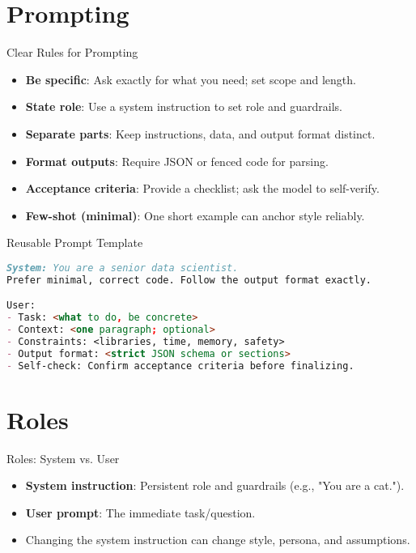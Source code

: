 \documentclass[aspectratio=169]{beamer}
\begin{document}
\section{Prompting}

\begin{frame}{Clear Rules for Prompting}
  \begin{itemize}
    \item \textbf{Be specific}: Ask exactly for what you need; set scope and length.
    \item \textbf{State role}: Use a system instruction to set role and guardrails.
    \item \textbf{Separate parts}: Keep instructions, data, and output format distinct.
    \item \textbf{Format outputs}: Require JSON or fenced code for parsing.
    \item \textbf{Acceptance criteria}: Provide a checklist; ask the model to self-verify.
    \item \textbf{Few-shot (minimal)}: One short example can anchor style reliably.
  \end{itemize}
\end{frame}

\begin{frame}[fragile]{Reusable Prompt Template}
\begin{lstlisting}[language=Markdown]
System: You are a senior data scientist.
Prefer minimal, correct code. Follow the output format exactly.

User:
- Task: <what to do, be concrete>
- Context: <one paragraph; optional>
- Constraints: <libraries, time, memory, safety>
- Output format: <strict JSON schema or sections>
- Self-check: Confirm acceptance criteria before finalizing.
\end{lstlisting}
\end{frame}

\section{Roles}

\begin{frame}{Roles: System vs. User}
  \begin{itemize}
    \item \textbf{System instruction}: Persistent role and guardrails (e.g., "You are a cat.").
    \item \textbf{User prompt}: The immediate task/question.
    \item Changing the system instruction can change style, persona, and assumptions.
  \end{itemize}
\end{frame}
\end{document}
